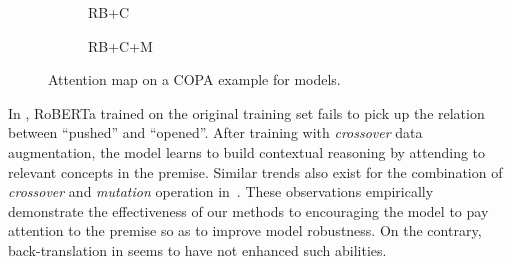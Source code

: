 \begin{figure}[th!]
\begin{subfigure}[b]{0.20\textwidth}
\caption{RB+C}
\label{fig:case_c}
\end{subfigure}
\hfill
\begin{subfigure}[b]{0.20\textwidth}
\centering
{}
\caption{RB+C+M}
\label{fig:case_cm}
\end{subfigure}
\caption{Attention map on a COPA example for models.}
\label{fig:case}
\end{figure}


In , 
RoBERTa trained on the original training set fails to pick up the 
relation between ``pushed'' and ``opened''. 
After training with \textit{crossover} data augmentation, 
the model learns to build contextual reasoning  
by attending to relevant concepts in the premise. 
Similar trends also exist for the combination of \textit{crossover} 
and \textit{mutation} operation in~. 
These observations empirically demonstrate the effectiveness of our methods 
to encouraging the model to pay attention to the premise so as to improve 
model robustness. On the contrary, back-translation in  seems 
to have not enhanced such abilities.

